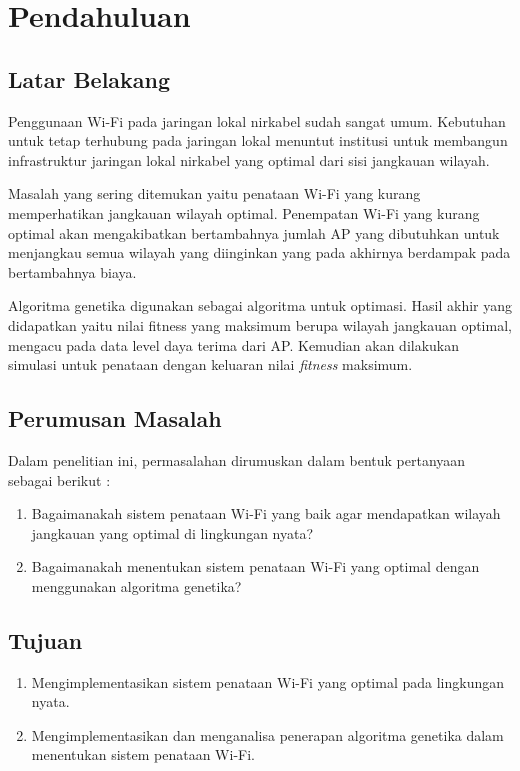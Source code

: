 \documentclass[12pt,a4paper]{report}
\begin{document}
		\chapter{Pendahuluan}
		\section{Latar Belakang}
		Penggunaan Wi-Fi pada jaringan lokal nirkabel sudah sangat umum. Kebutuhan untuk tetap terhubung pada jaringan lokal menuntut institusi untuk membangun infrastruktur jaringan lokal nirkabel yang optimal dari sisi jangkauan wilayah.
		
		Masalah yang sering ditemukan yaitu penataan Wi-Fi yang kurang memperhatikan jangkauan wilayah optimal. Penempatan Wi-Fi yang kurang optimal akan mengakibatkan bertambahnya jumlah AP yang dibutuhkan untuk menjangkau semua wilayah yang diinginkan yang pada akhirnya berdampak pada bertambahnya biaya. 
		
		Algoritma genetika digunakan sebagai algoritma untuk optimasi. Hasil akhir yang didapatkan yaitu nilai fitness yang maksimum berupa wilayah jangkauan optimal, mengacu pada data level daya terima dari AP. Kemudian akan dilakukan simulasi untuk penataan dengan keluaran nilai \emph{fitness} maksimum.
		\section{Perumusan Masalah}
		Dalam penelitian ini, permasalahan dirumuskan dalam bentuk pertanyaan sebagai berikut :
		\begin{enumerate}
			\item Bagaimanakah sistem penataan Wi-Fi yang baik agar mendapatkan wilayah jangkauan yang optimal di lingkungan nyata?
			\item Bagaimanakah menentukan sistem penataan Wi-Fi yang optimal dengan menggunakan algoritma genetika?
		\end{enumerate}
		\section{Tujuan}
		\begin{enumerate}
			\item Mengimplementasikan sistem penataan Wi-Fi yang optimal pada lingkungan nyata.
			\item Mengimplementasikan dan menganalisa penerapan algoritma genetika dalam menentukan sistem penataan Wi-Fi.
		\end{enumerate}
\end{document}
